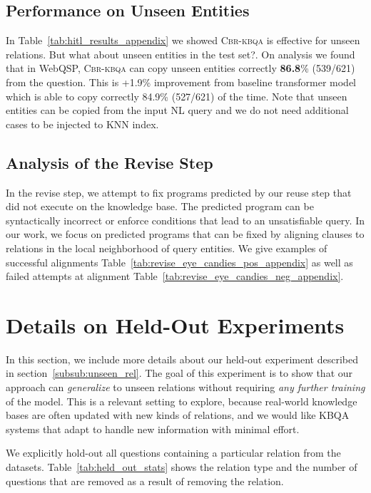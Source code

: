 \documentclass[11pt]{article}
\newcommand{\alg}{\textsc{Cbr-kbqa}\xspace}
\begin{document}
\subsection{Performance on Unseen Entities}
In Table~\ref{tab:hitl_results_appendix} we showed \alg is effective for unseen relations. But what about unseen entities in the test set?. On analysis we found that in WebQSP, \alg can copy unseen entities correctly \textbf{86.8}\% (539/621) from the question. This is +1.9\% improvement from baseline transformer model which is able to copy correctly 84.9\% (527/621) of the time. Note that unseen entities can be copied from the input NL query and we do not need additional cases to be injected to KNN index.


\subsection{Analysis of the Revise Step}


In the revise step, we attempt to fix programs predicted by our reuse step that did not execute on the knowledge base. The predicted program can be syntactically incorrect or enforce conditions that lead to an unsatisfiable query. In our work, we focus on predicted programs that can be fixed by aligning clauses to relations in the local neighborhood of query entities. We give examples of successful alignments Table~\ref{tab:revise_eye_candies_pos_appendix} as well as failed attempts at alignment Table~\ref{tab:revise_eye_candies_neg_appendix}.

\section{Details on Held-Out Experiments}
\label{sub:held_out_appendix}


In this section, we include more details about our held-out experiment described in section~\ref{subsub:unseen_rel}. The goal of this experiment is to show that our approach can \emph{generalize} to unseen relations without requiring \emph{any further training} of the model.
This is a relevant setting to explore, because real-world knowledge bases are often updated with new kinds of relations, and we would like KBQA systems that adapt to handle new information with minimal effort.

We explicitly hold-out all questions containing a particular relation from the datasets. Table~\ref{tab:held_out_stats} shows the relation type and the number of questions that are removed as a result of removing the relation.
\end{document}
